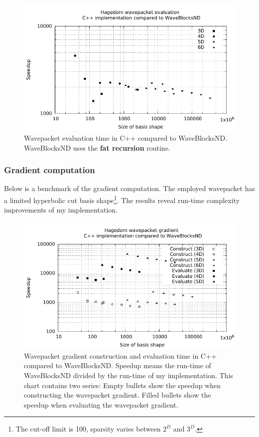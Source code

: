 \documentclass{article}
\begin{document}
\begin{figure}[H]
  \centering
  \includegraphics[width=1.0\textwidth]{plots/hawp_eval_cvp_fat}
  \caption{Wavepacket evaluation time in C++ compared to WaveBlocksND.
  WaveBlocksND uses the \textbf{fat recursion} routine.}
  \label{fig:hawp_eval_cvp_fat}
\end{figure}

\subsubsection{Gradient computation}

Below is a benchmark of the gradient computation. The employed wavepacket
has a limited hyperbolic cut basis shape\footnote{
  The cut-off limit is 100, sparsity varies between \(2^D\) and \(3^D\).}.
The results reveal run-time complexity improvements of my implementation.

\begin{figure}[H]
  \centering
  \includegraphics[width=1.0\textwidth]{plots/grad_eval_cvp}
  \caption{
    Wavepacket gradient construction and evaluation time in C++ compared to WaveBlocksND.
    Speedup means the run-time of WaveBlocksND divided by the run-time of my implementation.
    This chart contains two series: Empty bullets show the speedup when constructing
    the wavepacket gradient. Filled bullets show the speedup when evaluating the
    wavepacket gradient.
  }
  \label{fig:grad_eval_cvp}
\end{figure}
\end{document}

